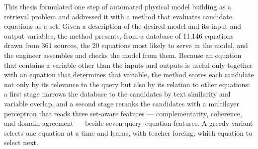
This thesis formulated one step of automated physical model building as a retrieval problem and
addressed it with a method that evaluates candidate equations as a set. Given a description of the
desired model and its input and output variables, the method presents, from a database of 11,146
equations drawn from 361 sources, the 20 equations most likely to serve in the model, and the
engineer assembles and checks the model from them. Because an equation that contains a variable
other than the inputs and outputs is useful only together with an equation that determines that
variable, the method scores each candidate not only by its relevance to the query but also by its
relation to other equations: a first stage narrows the database to the candidates by text
similarity and variable overlap, and a second stage reranks the candidates with a multilayer
perceptron that reads three set-aware features --- complementarity, coherence, and domain agreement
--- beside seven query--equation features. A greedy variant selects one equation at a time and
learns, with teacher forcing, which equation to select next.

